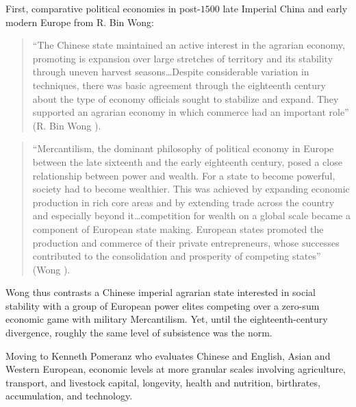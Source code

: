 \documentclass[12pt]{article}
\numberwithin{equation}{section}
\begin{document}
		First, comparative political economies in post-$1500$ late Imperial China and early modern Europe from R. Bin Wong:
		
		\begin{quotation}
		
		``The Chinese state maintained an active interest in the agrarian economy, promoting is expansion over large stretches of territory and its stability through uneven harvest seasons\ldots Despite considerable variation in techniques, there was basic agreement through the eighteenth century about the type of economy officials sought to stabilize and expand. They supported an agrarian economy in which commerce had an important role'' (R. Bin Wong \citeyear[pp.~115--16]{wong_china_1997}).
		\end{quotation}
		
		\begin{quotation}
		``Mercantilism, the dominant philosophy of political economy in Europe between the late sixteenth and the early eighteenth century, posed a close relationship between power and wealth. For a state to become powerful, society had to become wealthier. This was achieved by expanding economic production in rich core areas and by extending trade across the country and especially beyond it\ldots competition for wealth on a global scale became a component of European state making. European states promoted the production and commerce of their private entrepreneurs, whose successes contributed to the consolidation and prosperity of competing states'' (Wong \citeyear[p.~140]{wong_china_1997}).
		
		\end{quotation}
		
		Wong thus contrasts a Chinese imperial agrarian state interested in social stability with a group of European power elites competing over a zero-sum economic game with military Mercantilism. Yet, until the eighteenth-century divergence, roughly the same level of subsistence was the norm.

		
		Moving to Kenneth Pomeranz who evaluates Chinese and English, Asian and Western European, economic levels at more granular scales involving agriculture, transport, and livestock capital, longevity, health and nutrition, birthrates, accumulation, and technology.
		
\end{document}

